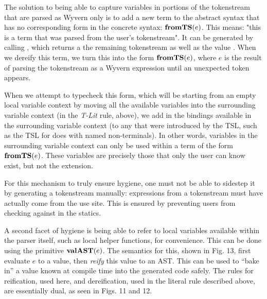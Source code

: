 The solution to being able to capture variables in portions of the tokenstream that are parsed as Wyvern only is to add a new term to the abstract syntax that has no corresponding form in the concrete syntax: $\textbf{fromTS}(e)$. This means: "this is a term that was parsed from the user's tokenstream". It can be generated by calling , which returns a the remaining tokenstream as well as the value  . When we dereify this term, we turn this into the form $\textbf{fromTS}(e)$, where $e$ is the result of parsing the tokenstream as a Wyvern expression until an unexpected token  appears.

When we attempt to typecheck this form, which will be starting from an empty local variable context by moving all the available variables into the surrounding variable context (in the \textit{T-Lit} rule, above), we add in the bindings available in the surrounding variable context (to any that were introduced by the TSL, such as the TSL for  does with named non-terminals). In other words, variables in the surrounding variable context can only be used within a term of the form $\textbf{fromTS}(e)$. These variables are precisely those that only the user can know exist, but not the extension.

For this mechanism to truly ensure hygiene, one must not be able to sidestep it by generating a tokenstream manually: expressions from a tokenstream must have actually come from the use site. This is ensured by preventing users from checking  against  in the statics.

A second facet of hygiene is being able to refer to local variables available within the parser itself, such as local helper functions, for convenience. This can be done using the primitive $\textbf{valAST}(e)$. The semantics for this, shown in Fig. 13, first evaluate $e$ to a value, then \emph{reify} this value to an AST. This can be used to ``bake in'' a value known at compile time into the generated code safely. The rules for reification, used here, and dereification, used in the literal rule described above, are essentially dual, as seen in Figs. 11 and 12.

